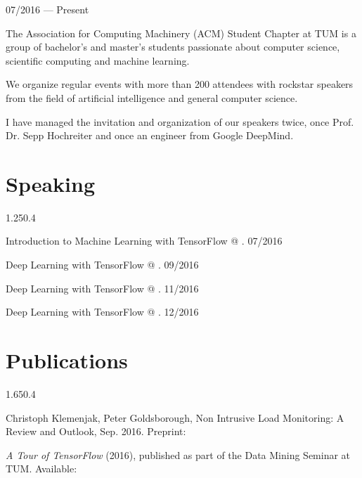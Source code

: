 \begin{entry}{}{}{07/2016 --- Present}
  \item The Association for Computing Machinery (ACM) Student Chapter at TUM is a group of bachelor's and master's students passionate about computer science, scientific computing and machine learning.
  \item We organize regular events with more than 200 attendees with rockstar speakers from the field of artificial intelligence and general computer science.
  \item I have managed the invitation and organization of our speakers twice, once Prof. Dr. Sepp Hochreiter and once an engineer from Google DeepMind.
\end{entry}

\section{Speaking}{1.25}{0.4}
\begin{simpleentry}
  \item Introduction to Machine Learning with TensorFlow @ . \hspace{3cm} 07/2016
  \item Deep Learning with TensorFlow @ . \hspace{7.65cm} 09/2016
  \item Deep Learning with TensorFlow @ . \hspace{5.03cm} 11/2016
  \item Deep Learning with TensorFlow @ . \hspace{6.95cm} 12/2016
\end{simpleentry}

\section{Publications}{1.65}{0.4}
\begin{simpleentry}
  \item Christoph Klemenjak, Peter Goldsborough, Non Intrusive Load Monitoring: A Review and Outlook, Sep. 2016. Preprint: 
  \item \emph{A Tour of TensorFlow} (2016), published as part of the Data Mining Seminar at TUM. Available: 
\end{simpleentry}

